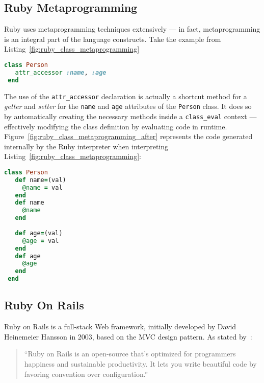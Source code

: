 \subsection{Ruby Metaprogramming}\label{sec:ruby_metaprogramming}

Ruby uses metaprogramming techniques extensively --- in fact, metaprogramming is an integral part of the language constructs. Take the example from Listing~\ref{fig:ruby_class_metaprogramming}

\begin{lstlisting}[language=ruby, float=htb, label=fig:ruby_class_metaprogramming, caption=Metaprogramming in Ruby classes.]
 class Person
   attr_accessor :name, :age
 end
\end{lstlisting}

The use of the \verb!attr_accessor! declaration is actually a shortcut method for a \emph{getter} and \emph{setter} for the \verb!name! and \verb!age! attributes of the \verb!Person! class. It does so by automatically creating the necessary methods inside a \verb!class_eval! context --- effectively modifying the class definition by evaluating code in runtime. Figure~\ref{fig:ruby_class_metaprogramming_after} represents the code generated internally by the Ruby interpreter when interpreting Listing~\ref{fig:ruby_class_metaprogramming}:

\begin{lstlisting}[language=ruby, float=htb, label=fig:ruby_class_metaprogramming_after, caption=Code generated by Ruby metaprogramming constructs.]
 class Person
   def name=(val)
     @name = val
   end
   def name
     @name
   end
   
   def age=(val)
     @age = val
   end
   def age
     @age
   end
 end
\end{lstlisting}

\subsection{Ruby On Rails}\label{sec:ror}

Ruby on Rails is a full-stack Web framework, initially developed by David Heinemeier Hansson in 2003, based on the MVC design pattern. As stated by~\cite{rubyonrails}:

\begin{quote}
  ``Ruby on Rails is an open-source that's optimized for programmers happiness and sustainable productivity. It lets you write beautiful code by favoring convention over configuration.''
\end{quote}

